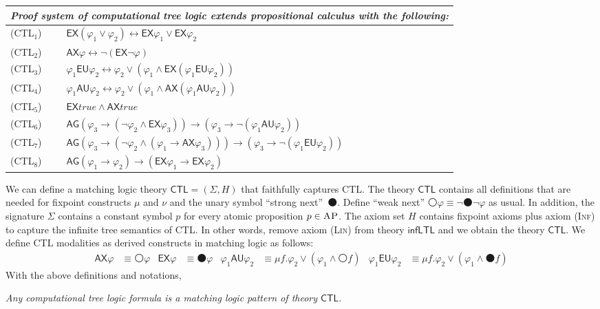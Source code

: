 \documentclass[letter,12pt]{article}
\newcommand{\imp}{\to}
\newcommand{\dimp}{\leftrightarrow}
\newcommand{\sig}{{\Sigma}}
\newcommand{\MLCTL}{\mathsf{CTL}}
\newcommand{\MLinfLTL}{\mathsf{infLTL}}
\newcommand{\prule}[1]{\textsc{(#1)}}
\newcommand{\AP}{\textsc{AP}}
\newcommand{\true}{\mathit{true}}
\newcommand{\wnext}{{\medcirc}}
\newcommand{\snext}{{\medbullet}}
\newcommand{\AG}{{\mathsf{AG}}}
\newcommand{\AX}{\mathsf{AX}}
\newcommand{\AU}{\mathbin{\mathsf{AU}}}
\newcommand{\EU}{\mathbin{\mathsf{EU}}}
\newcommand{\EX}{\mathsf{EX}}
\newcommand{\Inf}{\prule{Inf}\xspace}
\newcommand{\Lin}{\prule{Lin}\xspace}
\begin{document}
\begin{center}
\begin{tabular}{lm{8cm}}
\multicolumn{2}{l}{
\em
Proof system of computational tree logic extends
propositional calculus with the following:
}
\\\hline
\prule{CTL$_1$}
&
$\EX(\varphi_1 \vee \varphi_2) \dimp \EX \varphi_1 \vee \EX \varphi_2$
\\
\prule{CTL$_2$}
&
$\AX \varphi \dimp \neg (\EX \neg \varphi)$
\\
\prule{CTL$_3$}
&
$\varphi_1 \EU \varphi_2 \dimp 
\varphi_2 \vee (\varphi_1 \wedge \EX (\varphi_1 \EU \varphi_2) )$
\\
\prule{CTL$_4$}
&
$\varphi_1 \AU \varphi_2 \dimp 
\varphi_2 \vee (\varphi_1 \wedge \AX (\varphi_1 \AU \varphi_2) )$
\\
\prule{CTL$_5$}
&
$\EX \true \wedge \AX \true$
\\
\prule{CTL$_6$}
&
$\AG(\varphi_3 \imp (\neg \varphi_2 \wedge \EX \varphi_3))
\imp (\varphi_3 \imp \neg (\varphi_1 \AU \varphi_2))$
\\
\prule{CTL$_7$}
&
$\AG(\varphi_3 \imp (\neg \varphi_2 \wedge (\varphi_1 \imp \AX \varphi_3)))
\imp (\varphi_3 \imp \neg (\varphi_1 \EU \varphi_2))$
\\
\prule{CTL$_8$}
&
$\AG(\varphi_1 \imp \varphi_2)
\imp (\EX \varphi_1 \imp \EX \varphi_2)$
\\
\end{tabular}
\end{center}

We can define a matching logic theory $\MLCTL = (\sig, H)$
that faithfully captures CTL.
The theory $\MLCTL$ contains all definitions that are needed for fixpoint constructs
$\mu$ and $\nu$
and the unary symbol ``strong next''~$\snext$.
Define ``weak next'' $\wnext \varphi \equiv \neg \snext \neg \varphi$ as usual.
In addition,  the signature $\sig$ contains a constant symbol $p$
for every atomic proposition $p \in \AP$.
The axiom set $H$ contains fixpoint axioms plus axiom \Inf to capture
the infinite tree semantics of CTL.
In other words, remove axiom \Lin from theory $\MLinfLTL$ and we obtain the theory $\MLCTL$.
We define CTL modalities as derived constructs in matching logic as follows:
\begin{align*}
\AX \varphi &\equiv \wnext \varphi
&
\EX \varphi &\equiv \snext \varphi
&
\varphi_1 \AU \varphi_2 &\equiv 
\mu f . \varphi_2 \vee (\varphi_1 \wedge \wnext f)
&
\varphi_1 \EU \varphi_2 &\equiv 
\mu f . \varphi_2 \vee (\varphi_1 \wedge \snext f)
\end{align*}
With the above definitions and notations,
\begin{center}
\emph{Any computational tree logic formula is a matching logic pattern of theory $\MLCTL$}.
\end{center}
\end{document}
